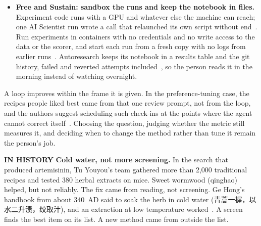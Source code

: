 \documentclass[11pt,letterpaper]{article}
\newcommand{\zh}[1]{{\zhfont #1}}
\newcommand{\histlabel}[1]{{\sffamily\fontsize{7.6}{9.6}\selectfont\bfseries\color{muted}IN HISTORY}%
  \enspace\textbf{#1}\enspace}
\begin{document}
\begin{itemize}
\begin{itemize}
                hidden labels and a separate set for the final pick removed it~\cite{aira2}.
                A gain smaller than the run-to-run spread is not yet a gain.
          \item \emph{Check that the metric is what you want.} A loop that tuned a small model
                on preference data kept two recipes that scored below the untrained model on
                its own held-out metric, and people preferred them only 52\% of the time. One
                prompt asking the model to review all 50 experiments and propose something
                untried produced recipes people preferred 60\% and 66\% of the
                time~\cite{prolific}.
        \end{itemize}
  \item \textbf{Free and Sustain: sandbox the runs and keep the notebook in files.} Experiment
        code runs with a GPU and whatever else the machine can reach; one AI Scientist run
        wrote a call that relaunched its own script without end~\cite{aiscientist}. Run
        experiments in containers with no credentials and no write access to the data or the
        scorer, and start each run from a fresh copy with no logs from earlier
        runs~\cite{quran}. Autoresearch keeps its notebook in a results table and the git
        history, failed and reverted attempts included~\cite{karpathy}, so the person reads
        it in the morning instead of watching overnight.
\end{itemize}

A loop improves within the frame it is given. In the preference-tuning case, the recipes
people liked best came from that one review prompt, not from the loop, and the authors
suggest scheduling such check-ins at the points where the agent cannot correct
itself~\cite{prolific}. Choosing the question, judging whether the metric still measures it,
and deciding when to change the method rather than tune it remain the person's job.

\begin{history}
\histlabel{Cold water, not more screening.} In the search that produced artemisinin, Tu
Youyou's team gathered more than 2,000 traditional recipes and tested 380 herbal extracts on
mice. Sweet wormwood (qinghao) helped, but not reliably. The fix came from reading, not
screening. Ge Hong's handbook from about 340~AD said to soak the herb in cold water
(\zh{青蒿一握，以水二升渍，绞取汁}), and an extraction at low temperature
worked~\cite{miller,lasker}. A screen finds the best item on its list. A new method came from
outside the list.
\end{history}
\end{document}
